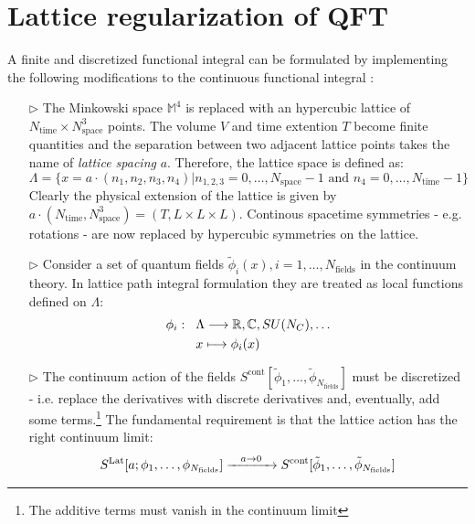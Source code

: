 \documentclass[english, LaM, oneside, noexaminfo]{sapthesis}
\begin{document}
\section{Lattice regularization of QFT}\label{sec:lattice-discretization}
\noindent
A finite and discretized functional integral can be formulated by implementing the following modifications to the continuous functional integral \cite{montvay-munster}\cite{gattringer-lang}:
\begin{itemize}
    \item [$\triangleright$] The Minkowski space $\mathbb{M}^4$ is replaced with an hypercubic lattice of $N_\text{time} \times N_\text{space}^3$ points.
        The volume $V$ and time extention $T$ become finite quantities and the separation between two adjacent lattice points takes the name of \textit{lattice spacing} $a$.
        Therefore, the lattice space is defined as:
        \begin{equation*}
            \Lambda = \{x = a\cdot(n_1,n_2,n_3,n_4) | n_{1,2,3} = 0,\dots,N_\text{space}-1 \text{ and } n_4 = 0,\dots,N_\text{time}-1 \}
        \end{equation*}
        Clearly the physical extension of the lattice is given by $a\cdot(N_\text{time},N_\text{space}^3) = (T,L\times L\times L)$.
        Continous spacetime symmetries - e.g. rotations - are now replaced by hypercubic symmetries on the lattice.
    \item [$\triangleright$] Consider a set of quantum fields $\tilde\phi_i(x), i = 1,\dots, N_\text{fields}$ in the continuum theory.
        In lattice path integral formulation they are treated as local functions defined on $\Lambda$:
        \begin{equation*}
            \begin{aligned}
                \phi_i : \hspace*{3mm}
                & \Lambda \longrightarrow \mathbb{R}, \mathbb{C}, SU(N_C), \dots \\
                & x \longmapsto \phi_i (x)
            \end{aligned}
        \end{equation*}
    \item [$\triangleright$] The continuum action of the fields $S^\text{cont}[\tilde\phi_1,\dots,\tilde\phi_{N_\text{fields}}]$ must be discretized - i.e. replace the derivatives with discrete derivatives and, eventually, add some terms.\footnote{The additive terms must vanish in the continuum limit}
        The fundamental requirement is that the lattice action has the right continuum limit: $$S^\text{Lat}[a;\phi_1,\dots,\phi_{N_\text{fields}}] \xrightarrow{\hspace*{3mm} a \rightarrow 0\hspace*{3mm}} S^\text{cont}[\tilde\phi_1,\dots,\tilde\phi_{N_\text{fields}}]$$

\end{itemize}
\end{document}
